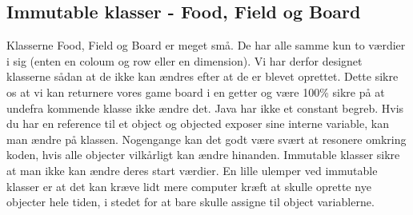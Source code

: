 \subsection*{Immutable klasser - Food, Field og Board}
Klasserne Food, Field og Board er meget små. De har alle samme kun to værdier i sig (enten en coloum og row eller en dimension). Vi har derfor designet klasserne sådan at de ikke kan ændres efter at de er blevet oprettet. Dette sikre os at vi kan returnere vores game board i en getter og være 100\% sikre på at undefra kommende klasse ikke ændre det. Java har ikke et constant begreb. Hvis du har en reference til et object og objected exposer sine interne variable,  kan man ændre på klassen. Nogengange kan det godt være svært at resonere omkring koden, hvis alle objecter vilkårligt kan ændre hinanden. Immutable klasser sikre at man ikke kan ændre deres start værdier. En lille ulemper ved immutable klasser er at det kan kræve lidt mere computer kræft at skulle oprette nye objecter hele tiden, i stedet for at bare skulle assigne til object variablerne.
